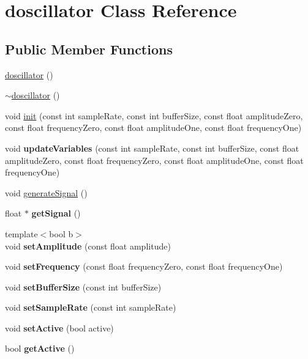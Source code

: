 \hypertarget{classdoscillator}{}\section{doscillator Class Reference}
\label{classdoscillator}
\subsection*{Public Member Functions}
\begin{DoxyCompactItemize}
\item 
\hyperlink{classdoscillator_a8b5fa400c8ae5fd605781b7487595511}{doscillator} ()
\item 
\hyperlink{classdoscillator_abf348b0e86d77618b2b3bc873a451a97}{$\sim$doscillator} ()
\item 
void \hyperlink{classdoscillator_aa683ebbb7aeed37e6a0d7011f6d0e322}{init} (const int sample\+Rate, const int buffer\+Size, const float amplitude\+Zero, const float frequency\+Zero, const float amplitude\+One, const float frequency\+One)
\item 
\mbox{\label{classdoscillator_a2a10b62376e5bbee84ffe27ea9a96302}} 
void {\bfseries update\+Variables} (const int sample\+Rate, const int buffer\+Size, const float amplitude\+Zero, const float frequency\+Zero, const float amplitude\+One, const float frequency\+One)
\item 
void \hyperlink{classdoscillator_abdc5fdfd0cc2fd9c83ed62fda3fc286f}{generate\+Signal} ()
\item 
\mbox{\label{classdoscillator_af93aafa661b9fc4060954fe5345c8a93}} 
float $\ast$ {\bfseries get\+Signal} ()
\item 
\mbox{\label{classdoscillator_a56994704237533af7d023a356c370f6d}} 
{\footnotesize template$<$bool b$>$ }\\void {\bfseries set\+Amplitude} (const float amplitude)
\item 
\mbox{\label{classdoscillator_a3b49a260b2f961bf1a2ed9a45a2bed35}} 
void {\bfseries set\+Frequency} (const float frequency\+Zero, const float frequency\+One)
\item 
\mbox{\label{classdoscillator_ade1b2e53ccfa55c736ada70be80e8e06}} 
void {\bfseries set\+Buffer\+Size} (const int buffer\+Size)
\item 
\mbox{\label{classdoscillator_a6729aeba9c2a01d882083a5718394db3}} 
void {\bfseries set\+Sample\+Rate} (const int sample\+Rate)
\item 
\mbox{\label{classdoscillator_a1761ced828bfa7c66a0a0b7a48c28595}} 
void {\bfseries set\+Active} (bool active)
\item 
\mbox{\label{classdoscillator_a7f9586eebd63267d80928301f77dc866}} 
bool {\bfseries get\+Active} ()
\end{DoxyCompactItemize}
